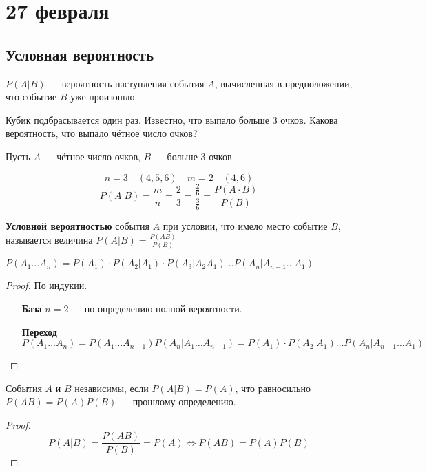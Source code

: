 \documentclass[12pt, a4paper, oneside]{book}
\begin{document}
\chapter{27 февраля}

\section{Условная вероятность}

\begin{obozn}
    \(P(A|B)\) --- вероятность наступления события \(A\), вычисленная в предположении, что событие \(B\) уже произошло.
\end{obozn}

\begin{example}
    Кубик подбрасывается один раз. Известно, что выпало больше \(3\) очков. Какова вероятность, что выпало чётное число очков?

    Пусть \(A\) --- чётное число очков, \(B\) --- больше \(3\) очков.

    \[n = 3 \quad (4, 5, 6) \quad m = 2 \quad (4, 6)\]
    \[P(A | B) = \frac{m}{n} = \frac{2}{3} = \frac{\frac{2}{6}}{\frac{3}{6}} = \frac{P(A \cdot B)}{P(B)}  \]
\end{example}

\begin{definition}
    \textbf{Условной вероятностью} события \(A\) при условии, что имело место событие \(B\), называется величина \(P(A|B) = \frac{P(AB)}{P(B)}\)
\end{definition}

\begin{theorem}
    \(P(A_1 \dots A_n) = P(A_1)\cdot P(A_2 | A_1)\cdot P(A_3| A_2A_1) \dots P(A_n | A_{n - 1}\dots A_1)\)
\end{theorem}
\begin{proof}
    По индукии.
    \begin{itemize}
        \item [\textbf{База}] \(n = 2\) --- по определению полной вероятности.
        \item [\textbf{Переход}] \[P(A_1 \dots A_n) = P(A_1\dots A_{n - 1}) P(A_n | A_1 \dots A_{n - 1}) = P(A_1)\cdot P(A_2 | A_1) \dots P(A_n | A_{n - 1}\dots A_1)\]
    \end{itemize}
\end{proof}

\begin{definition}
    События \(A\) и \(B\) независимы, если \(P(A|B) = P(A)\), что равносильно \(P(AB) = P(A)P(B)\) --- прошлому определению.
\end{definition}
\begin{proof}
    \[P(A|B) = \frac{P(AB)}{P(B)} = P(A) \Leftrightarrow P(AB) = P(A)P(B)\]
\end{proof}
\end{document}
